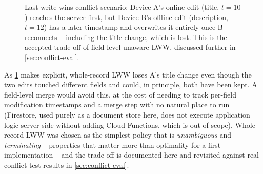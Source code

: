\begin{figure}[htbp]
  \centering
  \caption{Last-write-wins conflict scenario: Device A's online edit
  (title, $t{=}10$) reaches the server first, but Device B's offline edit
  (description, $t{=}12$) has a later timestamp and overwrites it entirely
  once B reconnects -- including the title change, which is lost. This is
  the accepted trade-off of field-level-unaware LWW, discussed further in
  \cref{sec:conflict-eval}.}
  \label{fig:conflict-scenario}
\end{figure}

As \cref{fig:conflict-scenario} makes explicit, whole-record LWW loses A's
title change even though the two edits touched different fields and could,
in principle, both have been kept. A field-level merge would avoid this,
at the cost of needing to track per-field modification timestamps and a
merge step with no natural place to run (Firestore, used purely as a
document store here, does not execute application logic server-side
without adding Cloud Functions, which is out of scope). Whole-record LWW
was chosen as the simplest policy that is \emph{unambiguous} and
\emph{terminating} -- properties that matter more than optimality for a
first implementation -- and the trade-off is documented here and revisited
against real conflict-test results in \cref{sec:conflict-eval}.

